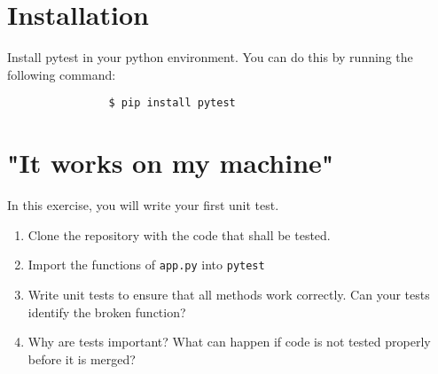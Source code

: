 \documentclass[english]{sheet}
\subtitle{Testing\textemdash PyTest}
\begin{document}
\maketitle

\section{Installation}
 Install pytest in your python environment. You can do this by running the following command:

            \begin{verbatim}
                $ pip install pytest
            \end{verbatim}

\section{"It works on my machine"}

\begin{exercise}
In this exercise, you will write your first unit test.
    \begin{enumerate}
        \item Clone the repository with the code that shall be tested.
	\item Import the functions of \texttt{app.py} into \texttt{pytest}
        \item Write unit tests to ensure that all methods work correctly. Can your tests identify the broken function?
        \item Why are tests important? What can happen if code is not tested properly before it is merged?
    \end{enumerate}
\end{exercise}
\end{document}

